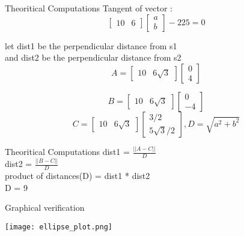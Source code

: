 \documentclass{beamer}
\begin{document}
 \begin{frame}{Theoritical Computations}
     Tangent of vector : 
$$\begin{bmatrix}
10 & 6
\end{bmatrix}
\begin{bmatrix}
a \\
b
\end{bmatrix}
 - 225 = 0  $$
 
 let dist1 be the perpendicular distance from s1 \\
 and dist2 be the perpendicular distance from s2 \\
 
 $$A = 
\begin{bmatrix}
 10 & 6\sqrt3
 \end{bmatrix}
\begin{bmatrix}
0\\
4
\end{bmatrix}$$

$$B =
\begin{bmatrix}
10 & 6\sqrt3
\end{bmatrix}
\begin{bmatrix}
0\\
-4
\end{bmatrix}$$
$$C = 
\begin{bmatrix}
10 & 6\sqrt3
\end{bmatrix}
\begin{bmatrix}
3/2 \\
5\sqrt3/2
\end{bmatrix},
D = 
  \sqrt{a^2 + b^2} $$
 \end{frame} 
 
 \begin{frame}{Theoritical Computations}
     dist1 = 
$\frac{||A-C||}{D}\ $\\

dist2 = 
$\frac{||B-C||}{D}\ $
\\
product of distances(D) = dist1 * dist2\\

D = 9
 \end{frame}
 
\begin{frame}{Graphical verification}

\texttt{[image: ellipse\_plot.png]}
 \end{frame}
\end{document}
